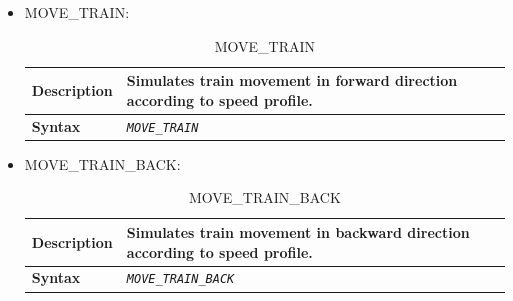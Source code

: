 \documentclass{template/openetcs}
\begin{document}
\begin{itemize}
\begin{longtable}{|l|l|l|}
			\hline \hline
			
		\end{longtable}
	
	\item MOVE\_TRAIN:
		
		\begin{longtable}{|l|l|}
		\caption{MOVE\_TRAIN}\\  
								
			\hline						
				
				\begin{minipage}[t]{0.22\linewidth} \textbf{Description} \end{minipage} 
			&	\begin{minipage}[t]{0.78\linewidth} Simulates train movement in forward direction according to speed profile. \end{minipage} \\
						
			\hline
									
				\begin{minipage}[t]{0.22\linewidth} \textbf{Syntax} \end{minipage}
			&	\begin{minipage}[t]{0.78\linewidth} \emph{\texttt{MOVE\_TRAIN}} \end{minipage} \\ 
			
			\hline \hline
			
		\end{longtable}
		
	\item MOVE\_TRAIN\_BACK:
		
		\begin{longtable}{|l|l|}
		\caption{MOVE\_TRAIN\_BACK}\\ 
						
			\hline						
				
				\begin{minipage}[t]{0.22\linewidth} \textbf{Description} \end{minipage} 
			&	\begin{minipage}[t]{0.78\linewidth} Simulates train movement in backward direction according to speed profile. \end{minipage} \\
						
			\hline
									
				\begin{minipage}[t]{0.22\linewidth} \textbf{Syntax} \end{minipage}
			&	\begin{minipage}[t]{0.78\linewidth} \emph{\texttt{MOVE\_TRAIN\_BACK}} \end{minipage} \\
				

\end{longtable}
\end{itemize}
\end{document}
